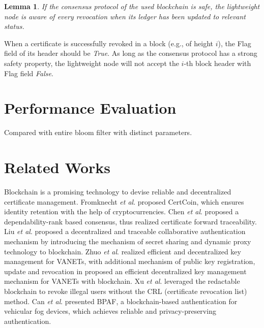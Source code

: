 \documentclass[conference]{IEEEtran}
\newtheorem{lemma}{Lemma}[theorem]
\begin{document}
\begin{lemma}
    If the consensus protocol of the used blockchain is safe, the lightweight node is aware of every revocation when its ledger has been updated to relevant status.
\end{lemma}

\begin{IEEEproof}
When a certificate is successfully revoked in a block (e.g., of height $i$), the Flag field of its header should be \textit{True}. As long as the consensus protocol has a strong safety property, the lightweight node will not accept the $i$-th block header with Flag field \textit{False}. 
\end{IEEEproof}

\section{Performance Evaluation} \label{sec:efficiency}

Compared with entire bloom filter with distinct parameters.

\section{Related Works}\label{section:related}
Blockchain is a promising technology to devise reliable and decentralized certificate management. Fromknecht \textit{et al}. 
\cite{fromknechtDecentralizedPublicKey} proposed CertCoin, which ensures identity retention with the help of cryptocurrencies. 
Chen \textit{et al}. \cite{chenCertchainPublicEfficient2018} proposed a dependability-rank based consensus, thus realized certificate forward traceability. Liu \textit{et al}. \cite{liuBlockchainEmpoweredCooperative2020}  proposed a decentralized and traceable collaborative authentication mechanism  by introducing the mechanism of secret sharing and dynamic proxy technology to blockchain. Zhuo \textit{et al}. realized efficient and decentralized key management for VANETs, with additional mechanism of public key registration, update and revocation in \cite{maEfficientDecentralizedKey2020} proposed an efficient decentralized key management mechanism for VANETs with blockchain. Xu \textit{et al}. \cite{xuIdentityManagementAuthentication2020} leveraged the redactable blockchain to revoke illegal users without the CRL (certificate revocation list) method. Can \textit{et al}. \cite{zhangBPAFBlockchainEnabledReliable2022} presented BPAF, a blockchain-based authentication for vehicular fog devices, which achieves reliable and privacy-preserving authentication.
\end{document}
